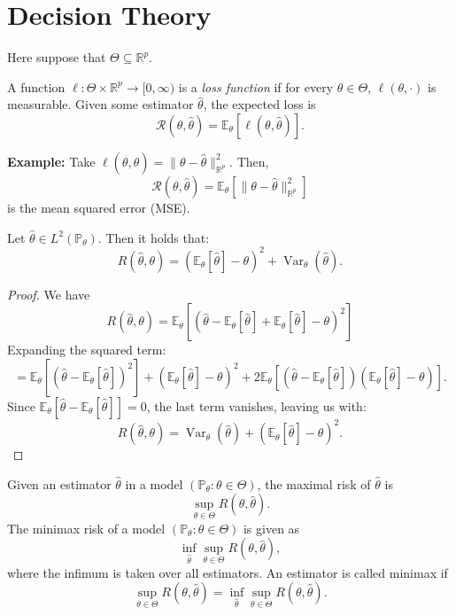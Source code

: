 \documentclass[open=any, 11pt,paper=A4]{scrreprt}
\begin{document}
\chapter{Decision Theory}

Here suppose that \(\Theta \subseteq \mathbb{R}^p\).
\begin{definition}
A function \(\ell : \Theta \times \mathbb{R}^p \to [0, \infty)\) is a \textit{loss function} if for every \(\theta \in \Theta\), \(\ell(\theta, \cdot)\) is measurable. Given some estimator \(\hat{\theta}\), the expected loss is
\[
\mathcal{R}(\theta, \hat{\theta}) = \mathbb{E}_\theta \left[\ell(\theta, \hat{\theta})\right].
\]
\end{definition}

\noindent \textbf{Example:} Take \(\ell(\theta, \hat{\theta}) = \| \theta - \hat{\theta} \|^2_{\mathbb{R}^p}.\) Then,
\[
\mathcal{R}(\theta, \hat{\theta}) = \mathbb{E}_\theta \left[\|\theta - \hat{\theta}\|^2_{\mathbb{R}^p} \right]
\]
is the mean squared error (MSE).

\begin{proposition}
    Let $\hat{\theta} \in L^2(\mathbb{P}_\theta)$. Then it holds that:
    \[
    R(\hat{\theta}, \theta) = (\mathbb{E}_\theta[\hat{\theta}] - \theta)^2 + \operatorname{Var}_\theta(\hat{\theta}).
    \]
\end{proposition}

\begin{proof}
    We have
    \[
    R(\hat{\theta}, \theta) = \mathbb{E}_\theta[(\hat{\theta} - \mathbb{E}_\theta[\hat{\theta}] + \mathbb{E}_\theta[\hat{\theta}] - \theta)^2]
    \]
    Expanding the squared term:
    \[
    = \mathbb{E}_\theta[(\hat{\theta} - \mathbb{E}_\theta[\hat{\theta}])^2] + (\mathbb{E}_\theta[\hat{\theta}] - \theta)^2 + 2\mathbb{E}_\theta[(\hat{\theta} - \mathbb{E}_\theta[\hat{\theta}])(\mathbb{E}_\theta[\hat{\theta}] - \theta)].
    \]
    Since $\mathbb{E}_\theta[\hat{\theta} - \mathbb{E}_\theta[\hat{\theta}]] = 0$, the last term vanishes, leaving us with:
    \[
    R(\hat{\theta}, \theta) = \operatorname{Var}_\theta(\hat{\theta}) + (\mathbb{E}_\theta[\hat{\theta}] - \theta)^2.
    \]
\end{proof}

\begin{definition}
    Given an estimator $\hat{\theta}$ in a model $(\mathbb{P}_\theta : \theta \in \Theta)$, the maximal risk of $\hat{\theta}$ is
    \[
    \sup_{\theta \in \Theta} R(\theta, \hat{\theta}).
    \]
    The minimax risk of a model $(\mathbb{P}_\theta : \theta \in \Theta)$ is given as
    \[
    \inf_{\hat{\theta}} \sup_{\theta \in \Theta} R(\theta, \hat{\theta}),
    \]
    where the infimum is taken over all estimators. An estimator is called minimax if
    \[
    \sup_{\theta \in \Theta} R(\theta, \hat{\theta}) = \inf_{\hat{\theta}} \sup_{\theta \in \Theta} R(\theta, \hat{\theta}).
    \]
\end{definition}
\end{document}
